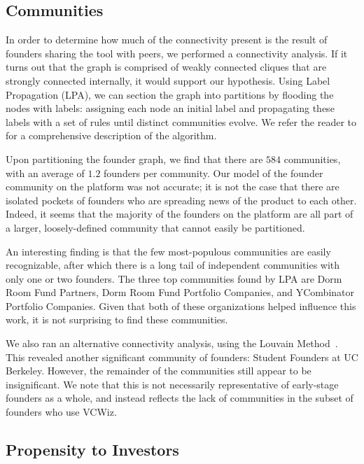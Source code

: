 \subsection{Communities}

In order to determine how much of the connectivity present is the result of founders sharing the tool with peers, we performed a connectivity analysis. If it turns out that the graph is comprised of weakly connected cliques that are strongly connected internally, it would support our hypothesis. Using Label Propagation (LPA), we can section the graph into partitions by flooding the nodes with labels: assigning each node an initial label and propagating these labels with a set of rules until distinct communities evolve. We refer the reader to \cite{2007PhRvE..76c6106R} for a comprehensive description of the algorithm.

Upon partitioning the founder graph, we find that there are $584$ communities, with an average of $1.2$ founders per community. Our model of the founder community on the platform was not accurate; it is not the case that there are isolated pockets of founders who are spreading news of the product to each other. Indeed, it seems that the majority of the founders on the platform are all part of a larger, loosely-defined community that cannot easily be partitioned.

An interesting finding is that the few most-populous communities are easily recognizable, after which there is a long tail of independent communities with only one or two founders. The three top communities found by LPA are Dorm Room Fund Partners, Dorm Room Fund Portfolio Companies, and YCombinator Portfolio Companies. Given that both of these organizations helped influence this work, it is not surprising to find these communities.

We also ran an alternative connectivity analysis, using the Louvain Method~\cite{2008JSMTE..10..008B}. This revealed another significant community of founders: Student Founders at UC Berkeley. However, the remainder of the communities still appear to be insignificant. We note that this is not necessarily representative of early-stage founders as a whole, and instead reflects the lack of communities in the subset of founders who use VCWiz.

\subsection{Propensity to Investors}

